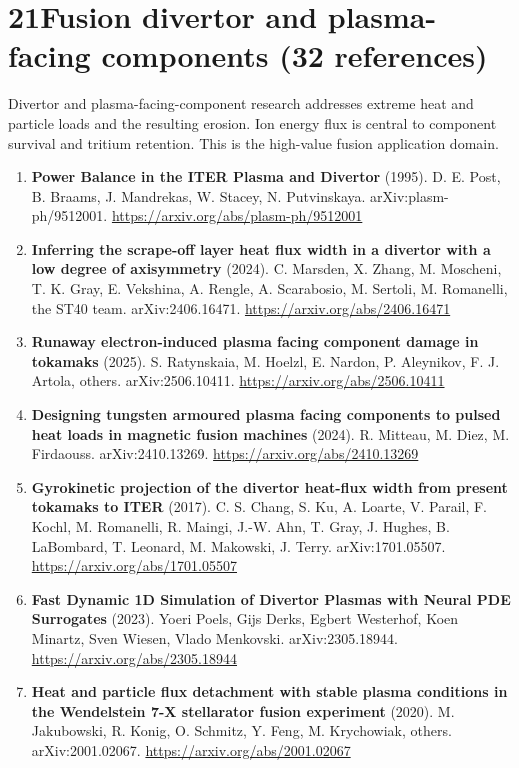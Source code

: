 \documentclass[11pt,a4paper]{article}
\begin{document}
\section*{21\quad Fusion divertor and plasma-facing components \textnormal{(\normalsize 32 references)}}
Divertor and plasma-facing-component research addresses extreme heat and particle loads and the resulting erosion. Ion energy flux is central to component survival and tritium retention. This is the high-value fusion application domain.
\begin{enumerate}[leftmargin=1.4em]
\item \textbf{Power Balance in the ITER Plasma and Divertor} (1995). D. E. Post, B. Braams, J. Mandrekas, W. Stacey, N. Putvinskaya. arXiv:plasm-ph/9512001. \url{https://arxiv.org/abs/plasm-ph/9512001}
\item \textbf{Inferring the scrape-off layer heat flux width in a divertor with a low degree of axisymmetry} (2024). C. Marsden, X. Zhang, M. Moscheni, T. K. Gray, E. Vekshina, A. Rengle, A. Scarabosio, M. Sertoli, M. Romanelli, the ST40 team. arXiv:2406.16471. \url{https://arxiv.org/abs/2406.16471}
\item \textbf{Runaway electron-induced plasma facing component damage in tokamaks} (2025). S. Ratynskaia, M. Hoelzl, E. Nardon, P. Aleynikov, F. J. Artola, others. arXiv:2506.10411. \url{https://arxiv.org/abs/2506.10411}
\item \textbf{Designing tungsten armoured plasma facing components to pulsed heat loads in magnetic fusion machines} (2024). R. Mitteau, M. Diez, M. Firdaouss. arXiv:2410.13269. \url{https://arxiv.org/abs/2410.13269}
\item \textbf{Gyrokinetic projection of the divertor heat-flux width from present tokamaks to ITER} (2017). C. S. Chang, S. Ku, A. Loarte, V. Parail, F. Kochl, M. Romanelli, R. Maingi, J.-W. Ahn, T. Gray, J. Hughes, B. LaBombard, T. Leonard, M. Makowski, J. Terry. arXiv:1701.05507. \url{https://arxiv.org/abs/1701.05507}
\item \textbf{Fast Dynamic 1D Simulation of Divertor Plasmas with Neural PDE Surrogates} (2023). Yoeri Poels, Gijs Derks, Egbert Westerhof, Koen Minartz, Sven Wiesen, Vlado Menkovski. arXiv:2305.18944. \url{https://arxiv.org/abs/2305.18944}
\item \textbf{Heat and particle flux detachment with stable plasma conditions in the Wendelstein 7-X stellarator fusion experiment} (2020). M. Jakubowski, R. Konig, O. Schmitz, Y. Feng, M. Krychowiak, others. arXiv:2001.02067. \url{https://arxiv.org/abs/2001.02067}

\end{enumerate}
\end{document}
